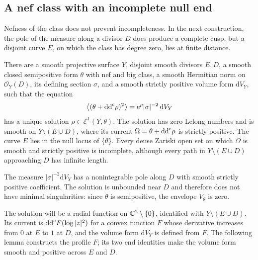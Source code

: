 \subsection{A nef class with an incomplete null end}
\label{sec:nef-incomplete-cusp}

Nefness of the class does not prevent incompleteness. In the next construction, the pole of the measure along a divisor $D$ does produce a complete cusp, but a disjoint curve $E$, on which the class has degree zero, lies at finite distance.

\begin{theorem}\label{thm:nef-incomplete-cusp}
There are a smooth projective surface $Y$, disjoint smooth divisors $E,D$, a smooth closed semipositive form $\theta$ with nef and big class, a smooth Hermitian norm on $\mathcal O_Y(D)$, its defining section $\sigma$, and a smooth strictly positive volume form $\mathrm{d}V_Y$, such that the equation
\begin{equation}\label{eq:nef-incomplete-cusp-equation}
 \left\langle(\theta+\mathrm{dd}^{\mathrm{c}}\rho)^2\right\rangle
 =\mathrm{e}^{\rho}|\sigma|^{-2}\,\mathrm{d}V_Y
\end{equation}
has a unique solution $\rho\in\mathcal E^1(Y,\theta)$. The solution has zero Lelong numbers and is smooth on $Y\setminus(E\cup D)$, where its current $\Omega=\theta+\mathrm{dd}^{\mathrm{c}}\rho$ is strictly positive. The curve $E$ lies in the null locus of $\{\theta\}$. Every dense Zariski open set on which $\Omega$ is smooth and strictly positive is incomplete, although every path in $Y\setminus(E\cup D)$ approaching $D$ has infinite length.
\end{theorem}

The measure $|\sigma|^{-2}\mathrm{d}V_Y$ has a nonintegrable pole along $D$ with smooth strictly positive coefficient. The solution is unbounded near $D$ and therefore does not have minimal singularities: since $\theta$ is semipositive, the envelope $V_\theta$ is zero.

The solution will be a radial function on $\mathbb C^2\setminus\{0\}$, identified with $Y\setminus(E\cup D)$. Its current is $\mathrm{dd}^{\mathrm{c}} F(\log|z|^2)$ for a convex function $F$ whose derivative increases from $0$ at $E$ to $1$ at $D$, and the volume form $\mathrm{d}V_Y$ is defined from $F$. The following lemma constructs the profile $F$; its two end identities make the volume form smooth and positive across $E$ and $D$.

